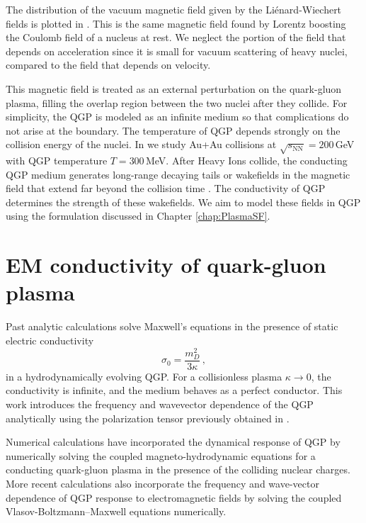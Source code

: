 The distribution of the vacuum magnetic field given by the Li\'enard-Wiechert fields is plotted in . This is the same magnetic field found by Lorentz boosting the Coulomb field of a nucleus at rest. We neglect the portion of the field that depends on acceleration since it is small for vacuum scattering of heavy nuclei, compared to the field that depends on velocity.

This magnetic field is treated as an external perturbation on the quark-gluon plasma, filling the overlap region between the two nuclei after they collide. For simplicity, the QGP is modeled as an infinite medium so that complications do not arise at the boundary. The temperature of QGP depends strongly on the collision energy of the nuclei. In \cite{Grayson:2022asf} we study Au+Au collisions at $\sqrt{s_{\text{NN}}}=200\,$GeV with QGP temperature $T=300$\,MeV.  After Heavy Ions collide, the conducting QGP medium generates long-range decaying tails or wakefields in the magnetic field that extend far beyond the collision time \cite{Tuchin:2010vs}. The conductivity of QGP determines the strength of these wakefields. We aim to model these fields in QGP using the formulation discussed in Chapter \ref{chap:PlasmaSF}.

\section{EM conductivity of quark-gluon plasma}

Past analytic calculations \cite{Tuchin:2010vs,Deng:2012pc,McLerran:2013hla,Tuchin:2013apa,Gursoy:2014aka,Li:2016tel,Roy:2015kma} solve Maxwell's equations in the presence of static electric conductivity 
\begin{equation}
   \sigma_0 = \frac{m_D^2}{3\kappa}\,,
\end{equation} 
in a  hydrodynamically evolving QGP. For a collisionless plasma $\kappa\rightarrow0$, the conductivity is infinite, and the medium behaves as a perfect conductor. This work introduces the frequency and wavevector dependence of the QGP analytically using the polarization tensor previously obtained in \cite{Formanek:2021blc}.

Numerical calculations \cite{Inghirami:2016iru, Inghirami:2019mkc} have incorporated the dynamical response of QGP by numerically solving the coupled magneto-hydrodynamic equations for a conducting quark-gluon plasma in the presence of the colliding nuclear charges. More recent calculations \cite{Yan:2021zjc,Wang:2021oqq} also incorporate the frequency and wave-vector dependence of QGP response to electromagnetic fields by solving the coupled Vlasov-Boltzmann--Maxwell equations numerically.



